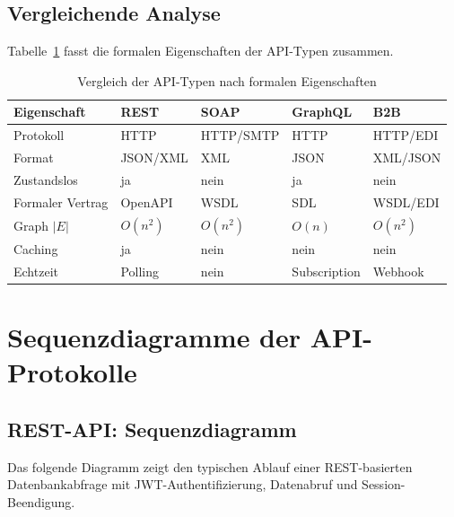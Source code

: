 ﻿\documentclass[a4paper,12pt]{article}
\theoremstyle{definition}
\begin{document}
\subsection{Vergleichende Analyse}

Tabelle~\ref{tab:vergleich} fasst die formalen Eigenschaften der API-Typen zusammen.

\begin{table}[ht]
\centering
\begin{tabularx}{\textwidth}{lXXXX}
\toprule
\textbf{Eigenschaft} & \textbf{REST} & \textbf{SOAP} & \textbf{GraphQL} & \textbf{B2B} \\
\midrule
Protokoll        & HTTP & HTTP/SMTP & HTTP & HTTP/EDI \\
Format           & JSON/XML & XML & JSON & XML/JSON \\
Zustandslos      & ja & nein & ja & nein \\
Formaler Vertrag & OpenAPI & WSDL & SDL & WSDL/EDI \\
Graph $|E|$      & $O(n^2)$ & $O(n^2)$ & $O(n)$ & $O(n^2)$ \\
Caching          & ja & nein & nein & nein \\
Echtzeit         & Polling & nein & Subscription & Webhook \\
\bottomrule
\end{tabularx}
\caption{Vergleich der API-Typen nach formalen Eigenschaften}
\label{tab:vergleich}
\end{table}

\section{Sequenzdiagramme der API-Protokolle}

\subsection{REST-API: Sequenzdiagramm}

Das folgende Diagramm zeigt den typischen Ablauf einer REST-basierten
Datenbankabfrage mit JWT-Authentifizierung, Datenabruf und Session-Beendigung.
\end{document}
